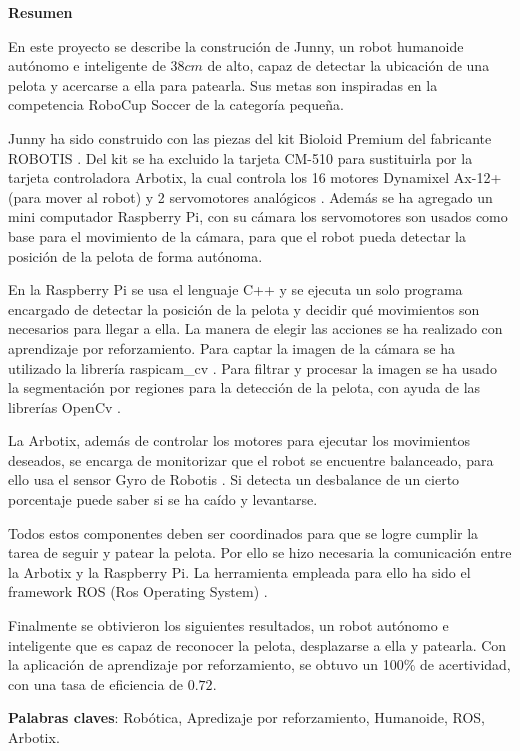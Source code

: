\setcounter{page}{4}
\begin{center}
	{\bf Resumen}  %
\end{center}	


En este proyecto se describe la construción de Junny, un robot humanoide autónomo e inteligente de $38 cm $ de alto, capaz de detectar la ubicación de una pelota y acercarse a ella para patearla. Sus metas son inspiradas en la competencia RoboCup Soccer de la categoría pequeña.

Junny ha sido construido con las piezas del kit Bioloid Premium  del fabricante ROBOTIS \cite{robotics}. Del kit se ha excluido la tarjeta CM-510 para sustituirla por la tarjeta controladora Arbotix, la cual controla los 16 motores Dynamixel Ax-12+ (para mover al robot) y 2 servomotores analógicos . Además se ha agregado un mini computador Raspberry Pi, con su cámara \cite{raspberrycam} los servomotores son usados como base para el movimiento de la c\'amara, para que el robot pueda detectar la posición de la pelota de forma autónoma. 

En la Raspberry Pi se usa el lenguaje C++ y se ejecuta un solo programa encargado de detectar la posición de la pelota y decidir qué movimientos son necesarios para llegar a ella. La manera de elegir las acciones se ha realizado con aprendizaje por reforzamiento. Para captar la imagen de la cámara se ha utilizado la librería raspicam\_cv \cite{camara}. Para filtrar y procesar la imagen se ha usado la segmentaci\'on por regiones para la detecci\'on de la pelota, con ayuda de las librerías OpenCv \cite{opencv}. 

La Arbotix, además de controlar los motores para ejecutar los movimientos deseados, se encarga de monitorizar que el robot se encuentre balanceado, para ello usa el sensor Gyro de Robotis \cite{gyro}. Si detecta un desbalance de un cierto porcentaje puede saber si se ha caído y levantarse.

Todos estos componentes deben ser coordinados para que se logre cumplir la tarea de seguir y patear la pelota. Por ello se hizo necesaria la comunicación entre la Arbotix y la Raspberry Pi. La herramienta 
empleada para ello ha sido el framework ROS (Ros Operating System) \cite{ros}. 

Finalmente se obtivieron los siguientes resultados, un robot aut\'onomo e inteligente que es capaz de reconocer la pelota, desplazarse a ella y patearla. Con la aplicaci\'on de aprendizaje por reforzamiento, se obtuvo un 100\% de acertividad, con una tasa de eficiencia de $0.72$.

\textbf{Palabras claves}: Rob\'otica, Apredizaje por reforzamiento, Humanoide, ROS, Arbotix.


